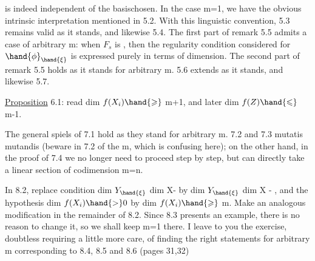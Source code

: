 
is indeed independent of the basis\hand{/}chosen. In the case m=1, we have
the obvious intrinsic interpretation mentioned in 5.2. With this
linguistic convention, 5.3 remains valid as it stands, and likewise 5.4.
The first part of remark 5.5 admits a  
 case of arbitrary m: when $F_s$ is  , then the regularity condition
considered for $\hand{\phi}_{\hand{\xi}}$ is expressed purely in terms of dimension.
The second part of remark 5.5 holds as it stands for arbitrary
m.  5.6 extends as it stands, and likewise 5.7.

\uline{Proposition} 6.1: read dim $f(X_i) \hand{\geqslant}$ m+1, and
later dim $f(Z) \hand{\leqslant}$ m-1.

The general spiels of 7.1 hold as they stand for arbitrary
m. 7.2 and 7.3 mutatis mutandis (beware in 7.2
of the  m, which is confusing here); on the other hand, in the proof
of 7.4 we no longer need to proceed step by step, but can
directly take a linear section of codimension m=n.

In 8.2, replace  condition dim $Y_{\hand{\xi}}$ \hand{$>$} dim X-
by dim $Y_{\hand{\xi}}$ \hand{$>$} dim X - , and the hypothesis dim $f(X_i) \hand{>} 0$ by
dim $f(X_i) \hand{\geqslant}$ m. Make an analogous modification in the remainder of 8.2. Since
8.3 presents an example, there is no reason to change it, so we
shall keep m=1 there. I leave to you the exercise, doubtless requiring
\hand{/}a little more care, of finding the right statements for arbitrary m
corresponding to 8.4, 8.5 and 8.6 (pages 31,32)\hand{;}

